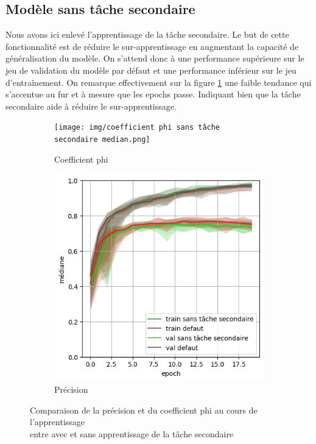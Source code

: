 \documentclass{article}
\begin{document}
\subsection{Modèle sans tâche secondaire}
Nous avons ici enlevé l'apprentissage de la tâche secondaire.
Le but de cette fonctionnalité est de réduire le sur-apprentissage en augmentant la capacité de généralisation du modèle.
On s'attend donc à une performance supérieure sur le jeu de validation du modèle par défaut et une performance inférieur sur le jeu d’entraînement.
On remarque effectivement sur la figure \ref{fig:modele_sans_tache_sec} une faible tendance qui s'accentue au fur et à mesure que les epochs passe. Indiquant bien que la tâche secondaire aide à réduire le sur-apprentissage.

\begin{figure}[H]
    \centering
    \captionsetup{justification=centering}
    \begin{subfigure}{0.39\textwidth}
      \texttt{[image: img/coefficient phi sans tâche secondaire median.png]}
      \centering
      \caption{Coefficient phi }
    \end{subfigure}
    \begin{subfigure}{0.39\textwidth}
      \includegraphics[width=\textwidth]{img/précision sans tâche secondaire median.png}
      \centering
      \caption{Précision}
    \end{subfigure}
    \caption{
        Comparaison de la précision et du coefficient phi au cours de l'apprentissage\\
        entre avec et sans apprentissage de la tâche secondaire
    }
    \label{fig:modele_sans_tache_sec}
\end{figure}
\end{document}
